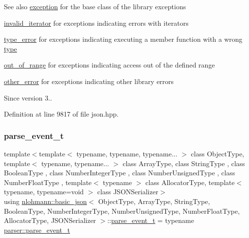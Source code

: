 \begin{DoxySeeAlso}{See also}
\hyperlink{classnlohmann_1_1basic__json_a9a0aced019cb1d65bb49703406c84970}{exception} for the base class of the library exceptions 

\hyperlink{classnlohmann_1_1basic__json_ac13d32f7cbd02d616e71d8dc30dadcbf}{invalid\+\_\+iterator} for exceptions indicating errors with iterators 

\hyperlink{classnlohmann_1_1basic__json_a4010e8e268fefd86da773c10318f2902}{type\+\_\+error} for exceptions indicating executing a member function with a wrong \hyperlink{classnlohmann_1_1basic__json_a2b2d781d7f2a4ee41bc0016e931cadf7}{type} 

\hyperlink{classnlohmann_1_1basic__json_a28f7c2f087274a0012eb7a2333ee1580}{out\+\_\+of\+\_\+range} for exceptions indicating access out of the defined range 

\hyperlink{classnlohmann_1_1basic__json_a3333a5a8714912adda33a35b369f7b3d}{other\+\_\+error} for exceptions indicating other library errors
\end{DoxySeeAlso}
\begin{DoxySince}{Since}
version 3.. 
\end{DoxySince}


Definition at line 9817 of file json.\+hpp.

\mbox{\label{classnlohmann_1_1basic__json_aaceba2e4cf75fc983bb75c78c8742e65}} 
\subsubsection{\texorpdfstring{parse\+\_\+event\+\_\+t}{parse\_event\_t}}
{\footnotesize\ttfamily template$<$template$<$ typename, typename, typename... $>$ class Object\+Type, template$<$ typename, typename... $>$ class Array\+Type, class String\+Type , class Boolean\+Type , class Number\+Integer\+Type , class Number\+Unsigned\+Type , class Number\+Float\+Type , template$<$ typename $>$ class Allocator\+Type, template$<$ typename, typename=void $>$ class J\+S\+O\+N\+Serializer$>$ \\
using \hyperlink{classnlohmann_1_1basic__json}{nlohmann\+::basic\+\_\+json}$<$ Object\+Type, Array\+Type, String\+Type, Boolean\+Type, Number\+Integer\+Type, Number\+Unsigned\+Type, Number\+Float\+Type, Allocator\+Type, J\+S\+O\+N\+Serializer $>$\+::\hyperlink{classnlohmann_1_1basic__json_aaceba2e4cf75fc983bb75c78c8742e65}{parse\+\_\+event\+\_\+t} =  typename \hyperlink{classnlohmann_1_1detail_1_1parser_a37ac88c864dda495f72cb62776b0bebe}{parser\+::parse\+\_\+event\+\_\+t}}



